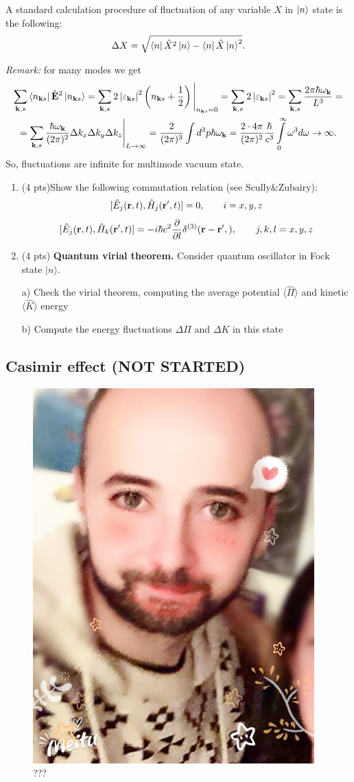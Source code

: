 	
	A standard calculation procedure of fluctuation of any variable $X$ in $\left\lvert {n} \right\rangle$ state is the following:
	\begin{equation}
		\Delta X = \sqrt{\left\langle {n} \right\rvert \hat{X}^2 \left\lvert {n} \right\rangle - \left\langle {n} \right\rvert \hat{X} \left\lvert {n} \right\rangle^2 }.
	\end{equation}
	
	\textit{Remark:} for many modes we get
	\begin{multline}
		\sum_{\mathbf{k},s} \left\langle {n_{\mathbf{k}s}} \right\rvert \hat{\mathbf{E}}^2 \left\lvert {n_{\mathbf{k}s}} \right\rangle = \sum_{\mathbf{k},s} 2 \left| \varepsilon_{\mathbf{k}s} \right|^2 \left( n_{\mathbf{k}s} + \frac{1}{2} \right) \Bigg|_{n_{\mathbf{k}s} = 0}  =  \sum_{\mathbf{k},s} 2 \left| \varepsilon_{\mathbf{k}s} \right|^2  =
		\sum_{\mathbf{k},s} \frac{2 \pi \hbar \omega_{\mathbf{k}}}{L^3} = \\ = \sum_{\mathbf{k},s} \frac{\hbar \omega_{\mathbf{k}}}{(2 \pi)^2} \Delta k_x \Delta k_y \Delta k_z \Bigg|_{L \to \infty} = \frac{2}{(2 \pi)^3} \int d^3 p \hbar \omega_{\mathbf{k}} = \frac{2 \cdot 4 \pi}{(2 \pi)^2} \frac{\hbar}{c^3} \int \limits_0^{\infty} \omega^3 d  \omega \to \infty.
	\end{multline}
So, fluctuations are infinite for multimode vacuum state.

	\begin{hw}
		
		\begin{enumerate}
		
		\item (4 pts)Show the following commutation relation (see Scully\&Zubairy):
		$$
		[\hat{E}_{j}({\bf r},t), \hat{H}_{j}({\bf r'},t)]=0, \qquad i=x,y,z
		$$
		$$
		[\hat{E}_{j}({\bf r},t), \hat{H}_{k}({\bf r'},t)]=-i\hbar c^{2}\dfrac{\partial}{\partial l}\delta^{(3)}({\bf r}-{\bf r'},), \qquad j,k,l=x,y,z
		$$
		
		
		\item (4 pts) {\bf Quantum virial theorem.} Consider quantum oscillator in Fock state $|n\rangle$.
		
		a) Check the virial theorem, computing the average potential $\langle \hat \Pi  \rangle$ and kinetic $\langle \hat K  \rangle$ energy
		
		b) Compute the energy fluctuations  $\Delta \Pi$ and $\Delta K$ in this state
		\end{enumerate}
	\end{hw}
	
	\subsection{Casimir effect (NOT STARTED)}
\begin{figure}
		\centering
		\includegraphics[width=0.4\linewidth]{fig/L1/tWo-qqZjraA}
		\caption{???}		
	\end{figure}
	